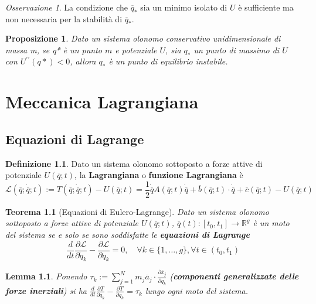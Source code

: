 \documentclass{book}
\theoremstyle{plain}
\newtheorem{teo}{Teorema}[chapter]
\theoremstyle{plain}
\newtheorem*{lemma}{Lemma}
\theoremstyle{plain}
\theoremstyle{plain}
\theoremstyle{plain}
\newtheorem{prop}{Proposizione}[chapter]
\theoremstyle{definition}
\newtheorem{defi}{Definizione}[chapter]
\theoremstyle{remark}
\newtheorem*{oss}{Osservazione}
\theoremstyle{definition}
\begin{document}
\begin{oss}
    La condizione che $\overline{q}_*$ sia un minimo isolato di $U$ è sufficiente ma non necessaria per la stabilità di $\overline{q}_*$.
\end{oss}

\begin{prop}
    Dato un sistema olonomo conservativo unidimensionale di massa m, se q* è un punto $m$ e potenziale $U$, sia $q_*$ un punto di massimo di $U$ con $U^{\prime\prime}(q*)<0$, allora $q_*$ è un punto di equilibrio instabile.
\end{prop}

\chapter{Meccanica Lagrangiana}

\section{Equazioni di Lagrange}

\begin{defi}
    Dato un sistema olonomo sottoposto a forze attive di potenziale $U(\overline{q}; t)$, la \textbf{Lagrangiana} o \textbf{funzione Lagrangiana} è
    \begin{displaymath}
    \boxed{
        \mathcal{L}(\overline{q};\dot{\overline{q}};t):=T(\overline{q};\dot{\overline{q}};t) - U(\overline{q};t) = \frac{1}{2}\dot{\overline{q}}A(\overline{q};t)\dot{\overline{q}} + \overline{b}(\overline{q};t)\cdot\dot{\overline{q}} + \overline{c}(\overline{q};t)-U(\overline{q};t)
        }
    \end{displaymath}
\end{defi}

\begin{teo}[Equazioni di Eulero-Lagrange]
    Dato un sistema olonomo sottoposto a forze attive di potenziale $U(\overline{q}; t)$, $\overline{q}(t):[t_0,t_1]\to\mathbb{R}^g$ è un moto del sistema se e solo se sono soddisfatte le \textbf{equazioni di Lagrange}
    \begin{displaymath}
    \boxed{
        \frac{d}{dt}\frac{\partial\mathcal{L}}{\partial\dot{q}_k} - \frac{\partial\mathcal{L}}{\partial q_k} = 0, \quad \forall k \in \{1,\ldots,g\}, \forall t \in (t_0,t_1)
        }
    \end{displaymath}
\end{teo}

\begin{lemma}
\everymath{\displaystyle}
    Ponendo $\tau_k:=\sum_{j=1}^N m_j\overline{a}_j \cdot \frac{\partial \overline{x}_j}{\partial q_k} $ (\textbf{componenti generalizzate delle forze inerziali}) si ha 
    $\frac{d}{dt}\frac{\partial T}{\partial\dot{q}_k} - \frac{\partial T}{\partial q_k} = \tau_k$ lungo ogni moto del sistema.
\end{lemma}
\end{document}
